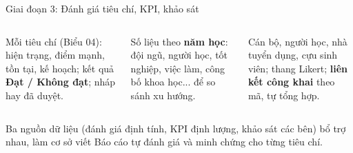 \documentclass[aspectratio=169, 11pt]{beamer}
\begin{document}
\begin{frame}{Giai đoạn 3: Đánh giá tiêu chí, KPI, khảo sát}
\vspace{0.1cm}
\begin{columns}[T]
\begin{column}{0.34\textwidth}
\begin{tcolorbox}[enhanced, colback=lightwarm, colframe=daumaroon, boxrule=0pt, leftrule=3pt, arc=2pt, title=Đánh giá 60 tiêu chí, fonttitle=\scriptsize\bfseries\color{white}, coltitle=white, colbacktitle=daumaroon, fontupper=\scriptsize]
Mỗi tiêu chí (Biểu 04): hiện trạng, điểm mạnh, tồn tại, kế hoạch; kết quả \textbf{Đạt / Không đạt}; nháp hay đã duyệt.
\end{tcolorbox}
\end{column}
\begin{column}{0.32\textwidth}
\begin{tcolorbox}[enhanced, colback=lightnavy, colframe=daunavy, boxrule=0pt, leftrule=3pt, arc=2pt, title=KPI (Biểu 16), fonttitle=\scriptsize\bfseries\color{white}, coltitle=white, colbacktitle=daunavy, fontupper=\scriptsize]
Số liệu theo \textbf{năm học}: đội ngũ, người học, tốt nghiệp, việc làm, công bố khoa học... để so sánh xu hướng.
\end{tcolorbox}
\end{column}
\begin{column}{0.32\textwidth}
\begin{tcolorbox}[enhanced, colback=lightgold, colframe=daugold!80!black, boxrule=0pt, leftrule=3pt, arc=2pt, title=Khảo sát (Biểu 08-11), fonttitle=\scriptsize\bfseries\color{daunavy}, coltitle=daunavy, colbacktitle=daugold, fontupper=\scriptsize]
Cán bộ, người học, nhà tuyển dụng, cựu sinh viên; thang Likert; \textbf{liên kết công khai} theo mã, tự tổng hợp.
\end{tcolorbox}
\end{column}
\end{columns}
\vspace{0.3cm}
\begin{keypoint}
Ba nguồn dữ liệu (đánh giá định tính, KPI định lượng, khảo sát các bên) bổ trợ nhau, làm cơ sở viết Báo cáo tự đánh giá và minh chứng cho từng tiêu chí.
\end{keypoint}
\end{frame}
\end{document}
